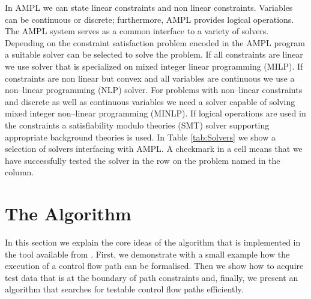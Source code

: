 \documentclass[runningheads,a4paper]{llncs}%
\begin{document}
In AMPL we can state linear constraints and non linear constraints. Variables can be continuous or discrete; furthermore, AMPL provides logical operations. The AMPL system serves as a common interface to a variety of solvers. Depending on the constraint satisfaction problem encoded in the AMPL program a suitable solver can be selected to solve the problem. If all constraints are linear we use solver that is specialized on mixed integer linear programming (MILP). If constraints are non linear but convex and all variables are continuous we use a non--linear programming (NLP) solver. For problems with non--linear constraints and discrete as well as continuous variables we need a solver capable of solving mixed integer non--linear programming (MINLP). If logical operations are used in the constraints a satisfiability modulo theories (SMT) solver supporting appropriate background theories is used. In Table \ref{tab:Solvers} we show a selection of solvers interfacing with AMPL. A checkmark in a cell means that we have successfully tested the solver in the row on the problem named in the column.%
\section{The Algorithm}%
\label{sec:Algorithm}%
In this section we explain the core ideas of the algorithm that is implemented in the tool available from \cite{PartegWebsite}. First, we demonstrate with a small example how the execution of a control flow path can be formalised. Then we show how to acquire test data that is at the boundary of path constraints and, finally, we present an algorithm that searches for testable control flow paths efficiently.%
\end{document}

